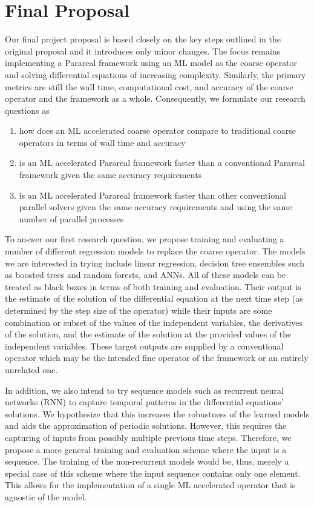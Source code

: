 \documentclass{article}
\begin{document}
\section{Final Proposal}

Our final project proposal is based closely on the key steps outlined in the original proposal and it introduces only minor changes. The focus remains implementing a Parareal framework using an ML model as the coarse operator and solving differential equations of increasing complexity. Similarly, the primary metrics are still the wall time, computational cost, and accuracy of the coarse operator and the framework as a whole. Consequently, we formulate our research questions as

\begin{enumerate}
    \item how does an ML accelerated coarse operator compare to traditional coarse operators in terms of wall time and accuracy
    \item is an ML accelerated Parareal framework faster than a conventional Parareal framework given the same accuracy requirements
    \item is an ML accelerated Parareal framework faster than other conventional parallel solvers given the same accuracy requirements and using the same number of parallel processes
\end{enumerate}

To answer our first research question, we propose training and evaluating a number of different regression models to replace the coarse operator. The models we are interested in trying include linear regression, decision tree ensembles such as boosted trees and random forests, and ANNs. All of these models can be treated as black boxes in terms of both training and evaluation. Their output is the estimate of the solution of the differential equation at the next time step (as determined by the step size of the operator) while their inputs are some combination or subset of the values of the independent variables, the derivatives of the solution, and the estimate of the solution at the provided values of the independent variables. These target outputs are supplied by a conventional operator which may be the intended fine operator of the framework or an entirely unrelated one.

In addition, we also intend to try sequence models such as recurrent neural networks (RNN) to capture temporal patterns in the differential equations' solutions. We hypothesize that this increases the robustness of the learned models and aids the approximation of periodic solutions. However, this requires the capturing of inputs from possibly multiple previous time steps. Therefore, we propose a more general training and evaluation scheme where the input is a sequence. The training of the non-recurrent models would be, thus, merely a special case of this scheme where the input sequence contains only one element. This allows for the implementation of a single ML accelerated operator that is agnostic of the model.
\end{document}

